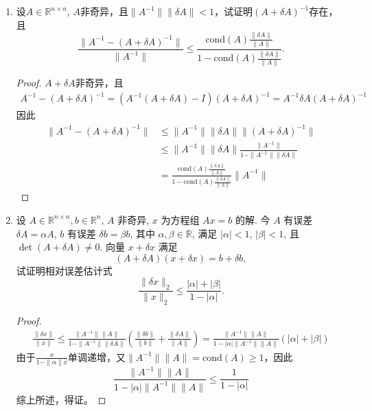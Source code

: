 \documentclass[a4paper]{article}
\begin{document}
\begin{enumerate}
  \item 设$A\in\mathbb{R}^{n\times n}$, $A$非奇异，且$\|A^{-1}\|\|\delta A\|<1$，试证明$(A+\delta A)^{-1}$存在，且
  $$\frac{\|A^{-1}-(A+\delta A)^{-1}\|}{\|A^{-1}\|}\leqslant\frac{\text{cond}(A)\frac{\|\delta A\|}{\|A\|}}{1-\text{cond}(A)\frac{\|\delta A\|}{\|A\|}}.$$
  \begin{proof}
    $A+\delta A$非奇异，且
    \begin{align*}
      A^{-1}-(A+\delta A)^{-1}=(A^{-1}(A+\delta A)-I)(A+\delta A)^{-1}=A^{-1}\delta A(A+\delta A)^{-1}
    \end{align*}
    因此
    \begin{align*}
      \|A^{-1}-(A+\delta A)^{-1}\|&\leqslant\|A^{-1}\|\|\delta A\|\|(A+\delta A)^{-1}\|\\
      &\leqslant\|A^{-1}\|\|\delta A\|\frac{\|A^{-1}\|}{1-\|A^{-1}\|\|\delta A\|}\\
      &=\frac{\text{cond}(A)\frac{\|\delta A\|}{\|A\|}}{1-\text{cond}(A)\frac{\|\delta A\|}{\|A\|}}\|A^{-1}\|
    \end{align*}

  \end{proof}  

  \item 设 $A \in \mathbb{R}^{n \times n}, b \in \mathbb{R}^n$, $A$ 非奇异, $x$ 为方程组 $Ax=b$ 的解. 今 $A$ 有误差 $\delta A = \alpha A$, $b$ 有误差 $\delta b = \beta b$, 其中 $\alpha, \beta \in \mathbb{R}$, 满足 $|\alpha| < 1$, $|\beta| < 1$, 且 $\det(A + \delta A) \neq 0$. 向量 $x + \delta x$ 满足
  $$(A + \delta A)(x + \delta x) = b + \delta b,$$
  试证明相对误差估计式
  $$
  \frac{\|\delta x\|_2}{\|x\|_2} \leqslant \frac{|\alpha| + |\beta|}{1 - |\alpha|}.$$
  \begin{proof}
    $$\begin{aligned}\frac{\|\delta x\|}{\|x\|}\leq\frac{\|A^{-1}\|\|A\|}{1-\|A^{-1}\|\|\delta A\|}\left(\frac{\|\delta b\|}{\|b\|}+\frac{\|\delta A\|}{\|A\|}\right)=\frac{\|A^{-1}\|\|A\|}{1-|\alpha| \|A^{-1}\|\|A\|}\left(|\alpha|+|\beta|\right)\end{aligned}$$
    由于$\frac{x}{1-\|\alpha\|x}$单调递增，又$\|A^{-1}\|\|A\|=\text{cond}(A)\geq1$，因此
    $$\frac{\|A^{-1}\|\|A\|}{1-|\alpha| \|A^{-1}\|\|A\|}\leq\frac{1}{1-|\alpha|}$$
    综上所述，得证。
  \end{proof}

\end{enumerate}
\end{document}
